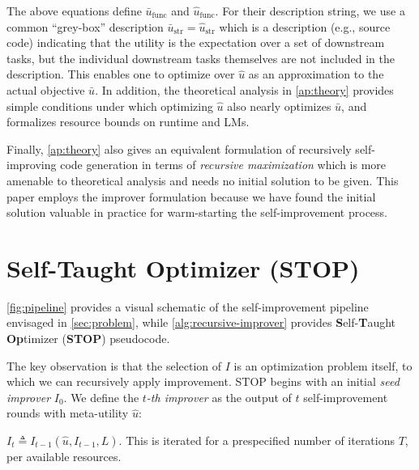 \documentclass{article}
\newcommand{\metautil}{{\hat{u}}}
\newcommand{\exputil}{{\bar{u}}}
\newcommand{\defeq}{\triangleq}
\begin{document}
The above equations define $\exputil_\text{func}$ and $\metautil_\text{func}$. For their description string, we use a common ``grey-box'' description $\exputil_\text{str}=\metautil_\text{str}$ which is a description (e.g., source code) indicating that the utility is the expectation over a set of downstream tasks, but the individual downstream tasks themselves are not included in the description. This enables one to optimize over $\metautil$ as an approximation to the actual objective $\exputil$. 
In addition, the theoretical analysis in \cref{ap:theory} provides simple conditions under which optimizing $\metautil$ also nearly optimizes $\exputil$, and formalizes resource bounds on runtime and LMs.


Finally, \cref{ap:theory} also 
gives an equivalent formulation of recursively self-improving code generation in terms of \textit{recursive maximization} which is more amenable to theoretical analysis and needs no initial solution to be given. This paper employs the improver formulation because we have found the initial solution valuable in practice for warm-starting the self-improvement process. 












\section{Self-Taught Optimizer (STOP)}

\label{sec:stop}

\cref{fig:pipeline} provides a visual schematic of the self-improvement pipeline envisaged in \cref{sec:problem}, while 
\cref{alg:recursive-improver} provides \textbf{S}elf-\textbf{T}aught \textbf{Op}timizer (\textbf{STOP}) pseudocode. 





The key observation is that the selection of $I$ is an optimization problem itself, to which we can recursively apply improvement. STOP begins with an initial \emph{seed improver} $I_0$. We define the \emph{$t$-th improver} as the output of $t$  self-improvement rounds with meta-utility $\metautil$:

$

I_{t} \defeq I_{t-1}(\metautil, I_{t-1}, L).\label{eq:it}


$
This is iterated for a prespecified number of iterations $T$, per available resources. \vspace{-2px}
\end{document}
